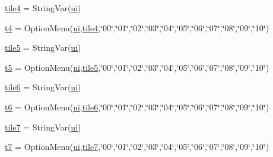 \begin{DoxyCompactItemize}
\item 
\mbox{\hyperlink{namespacegui_ad05cf08ea2bd8331ecd579ff357ba470}{tile4}} = String\+Var(\mbox{\hyperlink{namespacegui_a40ab7281456eadbea2dc2038f5c24fa1}{ui}})
\item 
\mbox{\hyperlink{namespacegui_a5f85979d64e0d248803bae1d0d37e6ae}{t4}} = Option\+Menu(\mbox{\hyperlink{namespacegui_a40ab7281456eadbea2dc2038f5c24fa1}{ui}},\mbox{\hyperlink{namespacegui_ad05cf08ea2bd8331ecd579ff357ba470}{tile4}},\char`\"{}00\char`\"{},\char`\"{}01\char`\"{},\char`\"{}02\char`\"{},\char`\"{}03\char`\"{},\char`\"{}04\char`\"{},\char`\"{}05\char`\"{},\char`\"{}06\char`\"{},\char`\"{}07\char`\"{},\char`\"{}08\char`\"{},\char`\"{}09\char`\"{},\char`\"{}10\char`\"{})
\item 
\mbox{\hyperlink{namespacegui_a9ed659ae603b4cb1b13bec5703143c39}{tile5}} = String\+Var(\mbox{\hyperlink{namespacegui_a40ab7281456eadbea2dc2038f5c24fa1}{ui}})
\item 
\mbox{\hyperlink{namespacegui_aa419ddc0f716e4a7e34799767b91e399}{t5}} = Option\+Menu(\mbox{\hyperlink{namespacegui_a40ab7281456eadbea2dc2038f5c24fa1}{ui}},\mbox{\hyperlink{namespacegui_a9ed659ae603b4cb1b13bec5703143c39}{tile5}},\char`\"{}00\char`\"{},\char`\"{}01\char`\"{},\char`\"{}02\char`\"{},\char`\"{}03\char`\"{},\char`\"{}04\char`\"{},\char`\"{}05\char`\"{},\char`\"{}06\char`\"{},\char`\"{}07\char`\"{},\char`\"{}08\char`\"{},\char`\"{}09\char`\"{},\char`\"{}10\char`\"{})
\item 
\mbox{\hyperlink{namespacegui_a05831122e36776d57f98dedba4233034}{tile6}} = String\+Var(\mbox{\hyperlink{namespacegui_a40ab7281456eadbea2dc2038f5c24fa1}{ui}})
\item 
\mbox{\hyperlink{namespacegui_a96de424b06e577384c741ad4e2615c2a}{t6}} = Option\+Menu(\mbox{\hyperlink{namespacegui_a40ab7281456eadbea2dc2038f5c24fa1}{ui}},\mbox{\hyperlink{namespacegui_a05831122e36776d57f98dedba4233034}{tile6}},\char`\"{}00\char`\"{},\char`\"{}01\char`\"{},\char`\"{}02\char`\"{},\char`\"{}03\char`\"{},\char`\"{}04\char`\"{},\char`\"{}05\char`\"{},\char`\"{}06\char`\"{},\char`\"{}07\char`\"{},\char`\"{}08\char`\"{},\char`\"{}09\char`\"{},\char`\"{}10\char`\"{})
\item 
\mbox{\hyperlink{namespacegui_a70acffcd35aab2bfac1aa2340f9dab4c}{tile7}} = String\+Var(\mbox{\hyperlink{namespacegui_a40ab7281456eadbea2dc2038f5c24fa1}{ui}})
\item 
\mbox{\hyperlink{namespacegui_aca1fa54d361750111ec04ea178d10c90}{t7}} = Option\+Menu(\mbox{\hyperlink{namespacegui_a40ab7281456eadbea2dc2038f5c24fa1}{ui}},\mbox{\hyperlink{namespacegui_a70acffcd35aab2bfac1aa2340f9dab4c}{tile7}},\char`\"{}00\char`\"{},\char`\"{}01\char`\"{},\char`\"{}02\char`\"{},\char`\"{}03\char`\"{},\char`\"{}04\char`\"{},\char`\"{}05\char`\"{},\char`\"{}06\char`\"{},\char`\"{}07\char`\"{},\char`\"{}08\char`\"{},\char`\"{}09\char`\"{},\char`\"{}10\char`\"{})

\end{DoxyCompactItemize}
